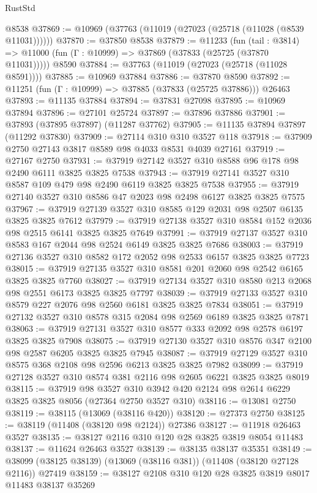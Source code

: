 \begin{lexlean}{RustStd}
\begin{coremodule}
    @8538
@37869 := @10969 (@37763 (@11019 (@27023 (@25718 (@11028 (@8539 @11031))))))
@37870 := @37850 @8538
@37879 := @11233
    (fun (tail : @3814) => @11000 (fun (Γ : @10999) => @37869 (@37833 (@25725 (@37870 @11031)))))
    @8590
@37884 := @37763 (@11019 (@27023 (@25718 (@11028 @8591))))
@37885 := @10969 @37884
@37886 := @37870 @8590
@37892 := @11251 (fun (Γ : @10999) => @37885 (@37833 (@25725 @37886))) @26463
@37893 := @11135 @37884
@37894 := @37831 @27098
@37895 := @10969 @37894
@37896 := @27101 @25724
@37897 := @37896 @37886
@37901 := @37893 (@37895 @37897) (@11287 @37762)
@37905 := @11135 @37894 @37897 (@11292 @37830)
@37909 := @27114 @310 @310 @3527 @118
@37918 := @37909 @2750 @27143 @3817 @8589 @98 @4033 @8531 @4039 @27161
@37919 := @27167 @2750
@37931 := @37919 @27142 @3527 @310 @8588 @96 @178 @98 @2490 @6111 @3825 @3825 @7538
@37943 := @37919 @27141 @3527 @310 @8587 @109 @479 @98 @2490 @6119 @3825 @3825 @7538
@37955 := @37919 @27140 @3527 @310 @8586 @47 @2023 @98 @2498 @6127 @3825 @3825 @7575
@37967 := @37919 @27139 @3527 @310 @8585 @129 @2031 @98 @2507 @6135 @3825 @3825 @7612
@37979 := @37919 @27138 @3527 @310 @8584 @152 @2036 @98 @2515 @6141 @3825 @3825 @7649
@37991 := @37919 @27137 @3527 @310 @8583 @167 @2044 @98 @2524 @6149 @3825 @3825 @7686
@38003 := @37919 @27136 @3527 @310 @8582 @172 @2052 @98 @2533 @6157 @3825 @3825 @7723
@38015 := @37919 @27135 @3527 @310 @8581 @201 @2060 @98 @2542 @6165 @3825 @3825 @7760
@38027 := @37919 @27134 @3527 @310 @8580 @213 @2068 @98 @2551 @6173 @3825 @3825 @7797
@38039 := @37919 @27133 @3527 @310 @8579 @227 @2076 @98 @2560 @6181 @3825 @3825 @7834
@38051 := @37919 @27132 @3527 @310 @8578 @315 @2084 @98 @2569 @6189 @3825 @3825 @7871
@38063 := @37919 @27131 @3527 @310 @8577 @333 @2092 @98 @2578 @6197 @3825 @3825 @7908
@38075 := @37919 @27130 @3527 @310 @8576 @347 @2100 @98 @2587 @6205 @3825 @3825 @7945
@38087 := @37919 @27129 @3527 @310 @8575 @368 @2108 @98 @2596 @6213 @3825 @3825 @7982
@38099 := @37919 @27128 @3527 @310 @8574 @381 @2116 @98 @2605 @6221 @3825 @3825 @8019
@38115 := @37919
    @98
    @3527
    @310
    @3942
    @420
    @2124
    @98
    @2614
    @6229
    @3825
    @3825
    @8056
    (@27364 @2750 @3527 @310)
@38116 := @13081 @2750
@38119 := @38115 (@13069 (@38116 @420))
@38120 := @27373 @2750
@38125 := @38119 (@11408 (@38120 @98 @2124)) @27386
@38127 := @11918 @26463 @3527
@38135 := @38127 @2116 @310 @120 @28 @3825 @3819 @8054 @11483
@38137 := @11624 @26463 @3527
@38139 := @38135 @38137 @35351
@38149 := @38099 (@38125 @38139) (@13069 (@38116 @381)) (@11408 (@38120 @27128 @2116)) @27419
@38159 := @38127 @2108 @310 @120 @28 @3825 @3819 @8017 @11483 @38137 @35269

\end{coremodule}
\end{lexlean}
